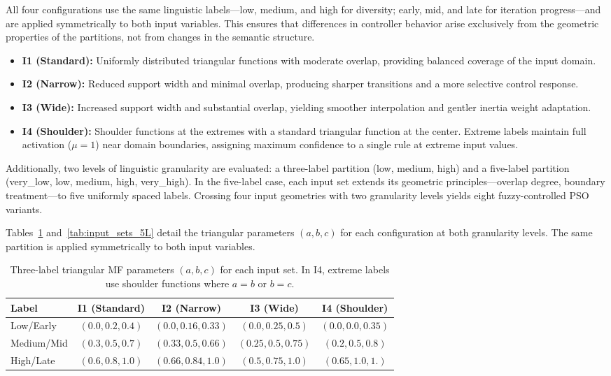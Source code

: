 All four configurations use the same linguistic labels---low, medium, and high for diversity; early, mid, and late for iteration progress---and are applied symmetrically to both input variables. This ensures that differences in controller behavior arise exclusively from the geometric properties of the partitions, not from changes in the semantic structure.

\begin{itemize}
    \item \textbf{I1 (Standard):} Uniformly distributed triangular functions with moderate overlap, providing balanced coverage of the input domain.
    \item \textbf{I2 (Narrow):} Reduced support width and minimal overlap, producing sharper transitions and a more selective control response.
    \item \textbf{I3 (Wide):} Increased support width and substantial overlap, yielding smoother interpolation and gentler inertia weight adaptation.
    \item \textbf{I4 (Shoulder):} Shoulder functions at the extremes with a standard triangular function at the center. Extreme labels maintain full activation ($\mu = 1$) near domain boundaries, assigning maximum confidence to a single rule at extreme input values.
\end{itemize}

Additionally, two levels of linguistic granularity are evaluated: a three-label partition (low, medium, high) and a five-label partition (very\_low, low, medium, high, very\_high). In the five-label case, each input set extends its geometric principles---overlap degree, boundary treatment---to five uniformly spaced labels. Crossing four input geometries with two granularity levels yields eight fuzzy-controlled PSO variants.

Tables~\ref{tab:input_sets_3L} and~\ref{tab:input_sets_5L} detail the triangular parameters $(a, b, c)$ for each configuration at both granularity levels. The same partition is applied symmetrically to both input variables.

\begin{table}[htbp]
    \caption{Three-label triangular MF parameters $(a, b, c)$ for each input set. In I4, extreme labels use shoulder functions where $a{=}b$ or $b{=}c$.}
    \label{tab:input_sets_3L}
    \centering
    \begin{tabular}{lcccc}
    \toprule
    Label & I1 (Standard) & I2 (Narrow) & I3 (Wide) & I4 (Shoulder) \\
    \midrule
    Low/Early   & $(0.0, 0.2, 0.4)$ & $(0.0, 0.16, 0.33)$ & $(0.0, 0.25, 0.5)$ & $(0.0, 0.0, 0.35)$ \\
    Medium/Mid  & $(0.3, 0.5, 0.7)$ & $(0.33, 0.5, 0.66)$ & $(0.25, 0.5, 0.75)$ & $(0.2, 0.5, 0.8)$ \\
    High/Late   & $(0.6, 0.8, 1.0)$ & $(0.66, 0.84, 1.0)$ & $(0.5, 0.75, 1.0)$ & $(0.65, 1.0, 1.)$ \\
    \bottomrule
    \end{tabular}
\end{table}

